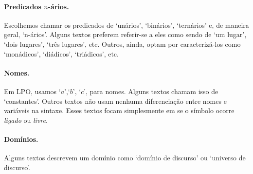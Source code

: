 \paragraph{Predicados $n$-ários.} Escolhemos chamar os predicados de `unários', `binários', `ternários' e, de maneira geral, `n-ários'. Alguns textos preferem referir-se a eles como sendo de `um lugar', `dois lugares', `três lugares', etc. Outros, ainda, optam por caracterizá-los como `monádicos', `diádicos', `triádicos', etc.

\paragraph{Nomes.} Em LPO, usamos `$a$',`$b$', `$c$', para nomes. Alguns textos chamam isso de `constantes'. Outros textos não usam nenhuma diferenciação entre nomes e variáveis na sintaxe. Esses textos focam simplesmente em se o símbolo ocorre \emph{ligado} ou \emph{livre}.

\paragraph{Domínios.} Alguns textos descrevem um domínio como `domínio de discurso' ou `universo de discurso'.

